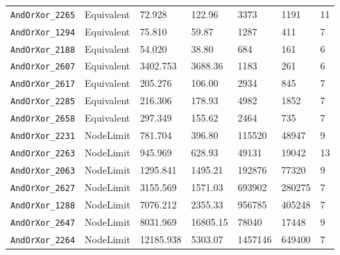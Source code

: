 \begin{tabular}{lllllll}
\texttt{AndOrXor\_2265} & Equivalent & 72.928 & 122.96 & 3373 & 1191 & 11 \\
\texttt{AndOrXor\_1294} & Equivalent & 75.810 & 59.87 & 1287 & 411 & 7 \\
\texttt{AndOrXor\_2188} & Equivalent & 54.020 & 38.80 & 684 & 161 & 6 \\
\texttt{AndOrXor\_2607} & Equivalent & 3402.753 & 3688.36 & 1183 & 261 & 6 \\
\texttt{AndOrXor\_2617} & Equivalent & 205.276 & 106.00 & 2934 & 845 & 7 \\
\texttt{AndOrXor\_2285} & Equivalent & 216.306 & 178.93 & 4982 & 1852 & 7 \\
\texttt{AndOrXor\_2658} & Equivalent & 297.349 & 155.62 & 2464 & 735 & 7 \\
\texttt{AndOrXor\_2231} & NodeLimit & 781.704 & 396.80 & 115520 & 48947 & 9 \\
\texttt{AndOrXor\_2263} & NodeLimit & 945.969 & 628.93 & 49131 & 19042 & 13 \\
\texttt{AndOrXor\_2063} & NodeLimit & 1295.841 & 1495.21 & 192876 & 77320 & 9 \\
\texttt{AndOrXor\_2627} & NodeLimit & 3155.569 & 1571.03 & 693902 & 280275 & 7 \\
\texttt{AndOrXor\_1288} & NodeLimit & 7076.212 & 2355.33 & 956785 & 405248 & 7 \\
\texttt{AndOrXor\_2647} & NodeLimit & 8031.969 & 16805.15 & 78040 & 17448 & 9 \\
\texttt{AndOrXor\_2264} & NodeLimit & 12185.938 & 5303.07 & 1457146 & 649400 & 7 \\
\bottomrule
\end{tabular}
